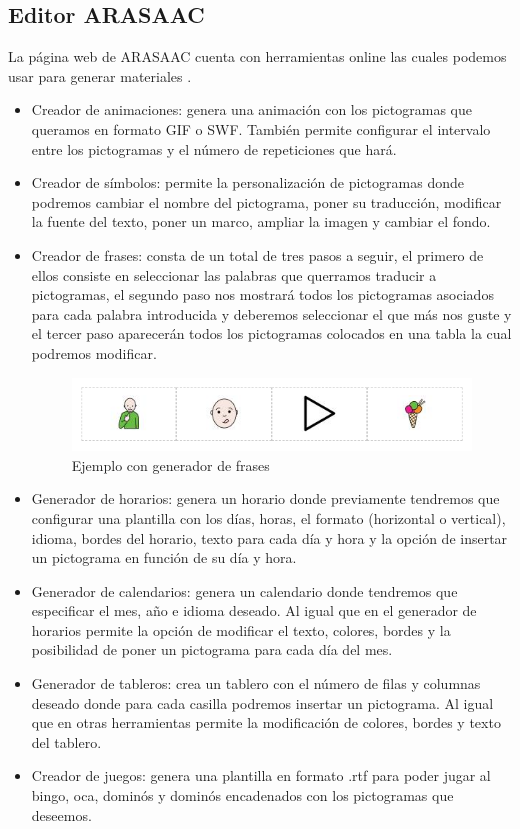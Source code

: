 \subsection{Editor ARASAAC}
La página web de ARASAAC cuenta con herramientas online las cuales podemos usar para generar materiales .
\begin{itemize}
\item Creador de animaciones: genera una animación con los pictogramas que queramos en formato GIF o SWF. También permite configurar el intervalo entre los pictogramas y el número de repeticiones que hará.

\item Creador de símbolos: permite la personalización de pictogramas donde podremos cambiar el nombre del pictograma, poner su traducción, modificar la fuente del texto, poner un marco, ampliar la imagen y cambiar el fondo.

\item Creador de frases: consta de un total de tres pasos a seguir, el primero de ellos consiste en seleccionar las palabras que querramos traducir a pictogramas, el segundo paso nos mostrará todos los pictogramas asociados para cada palabra introducida y deberemos seleccionar el que más nos guste y el tercer paso aparecerán todos los pictogramas colocados en una tabla la cual podremos modificar.

\begin{figure}[h!]
	\centering
	\includegraphics[width=0.7\linewidth]{Imagenes/Bitmap/Frase ARASAAC}
	\caption{Ejemplo con generador de frases}
	\label{fig:frase-arasaac}
\end{figure}


\item Generador de horarios: genera un horario donde previamente tendremos que configurar una plantilla con los días, horas, el formato (horizontal o vertical), idioma, bordes del horario, texto para cada día y hora y la opción de insertar un pictograma en función de su día y hora.

\item Generador de calendarios: genera un calendario donde tendremos que especificar el mes, año e idioma deseado. Al igual que en el generador de horarios permite la opción de modificar el texto, colores, bordes y la posibilidad de poner un pictograma para cada día del mes.

\item Generador de tableros: crea un tablero con el número de filas y columnas deseado donde para cada casilla podremos insertar un pictograma. Al igual que en otras herramientas permite la modificación de colores, bordes y  texto del tablero.

\item Creador de juegos: genera una plantilla en formato .rtf para poder jugar al bingo, oca, dominós y dominós encadenados con los pictogramas que deseemos.
\end{itemize}

